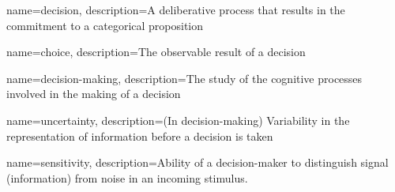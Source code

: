 {
    name=decision,
    description={A deliberative process that results in the commitment to a categorical proposition \cite{goldNeuralBasisDecision2007}}
}

{
    name=choice,
    description={The observable result of a decision}
}

{
    name=decision-making,
    description={The study of the cognitive processes involved in the making of a decision}
}

{
    name=uncertainty,
    description={(In decision-making) Variability in the representation of information before a decision is taken \cite{mamassianConfidenceForcedChoiceOther2020}}
}

{
    name=sensitivity,
    description={Ability of a decision-maker to distinguish signal (information) from noise in an incoming stimulus.}
}

